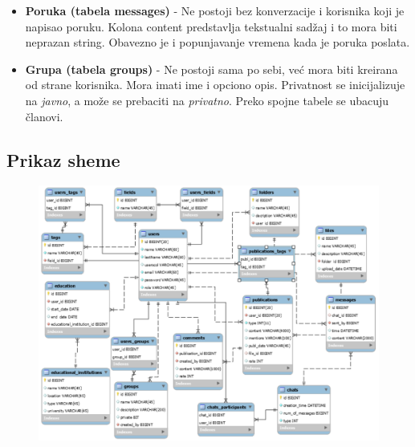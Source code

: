 \begin{itemize}
    \item \textbf{Poruka (tabela messages)} -
    Ne postoji bez konverzacije i korisnika koji je napisao poruku. Kolona content predstavlja tekstualni sadžaj i to mora biti neprazan string. Obavezno je i popunjavanje vremena kada je poruka poslata.
    
    \item \textbf{Grupa (tabela groups)} -
    Ne postoji sama po sebi, već mora biti kreirana od strane korisnika. Mora imati ime i opciono opis. Privatnost se inicijalizuje na \textit{javno}, a može se prebaciti na \textit{privatno}. Preko spojne tabele se ubacuju članovi.
    
\end{itemize}

\subsection{Prikaz sheme}
\begin{figure}[h]
		\centerline{\includegraphics[scale=0.9]{slike/shema.png}}
\end{figure}

